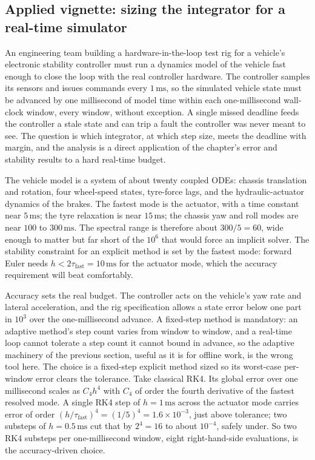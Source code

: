 \subsection{Applied vignette: sizing the integrator for a real-time simulator}

An engineering team building a hardware-in-the-loop test rig for a
vehicle's electronic stability controller must run a dynamics model of
the vehicle fast enough to close the loop with the real controller
hardware. The controller samples its sensors and issues commands every
$1\,\si{\milli\second}$, so the simulated vehicle state must be advanced
by one millisecond of model time within each one-millisecond wall-clock
window, every window, without exception. A single missed deadline feeds
the controller a stale state and can trip a fault the controller was
never meant to see. The question is which integrator, at which step
size, meets the deadline with margin, and the analysis is a direct
application of the chapter's error and stability results to a hard
real-time budget.

The vehicle model is a system of about twenty coupled ODEs: chassis
translation and rotation, four wheel-speed states, tyre-force lags, and
the hydraulic-actuator dynamics of the brakes. The fastest mode is the
actuator, with a time constant near $5\,\si{\milli\second}$; the tyre
relaxation is near $15\,\si{\milli\second}$; the chassis yaw and roll
modes are near $100$ to $300\,\si{\milli\second}$. The spectral range is
therefore about $300/5 = 60$, wide enough to matter but far short of the
$10^{6}$ that would force an implicit solver. The stability constraint
for an explicit method is set by the fastest mode: forward Euler needs
$h < 2\tau_{\text{fast}} = 10\,\si{\milli\second}$ for the actuator
mode, which the accuracy requirement will beat comfortably.

Accuracy sets the real budget. The controller acts on the vehicle's yaw
rate and lateral acceleration, and the rig specification allows a state
error below one part in $10^{3}$ over the one-millisecond advance. A
fixed-step method is mandatory: an adaptive method's step count varies
from window to window, and a real-time loop cannot tolerate a step
count it cannot bound in advance, so the adaptive machinery of the
previous section, useful as it is for offline work, is the wrong tool
here. The choice is a fixed-step explicit method sized so its
worst-case per-window error clears the tolerance. Take classical RK4.
Its global error over one millisecond scales as $C_{4} h^{4}$ with
$C_{4}$ of order the fourth derivative of the fastest resolved mode. A
single RK4 step of $h = 1\,\si{\milli\second}$ across the actuator mode
carries error of order $(h/\tau_{\text{fast}})^{4} = (1/5)^{4}
= 1.6 \times 10^{-3}$, just above tolerance; two substeps of
$h = 0.5\,\si{\milli\second}$ cut that by $2^{4} = 16$ to about
$10^{-4}$, safely under. So two RK4 substeps per one-millisecond window,
eight right-hand-side evaluations, is the accuracy-driven choice.

